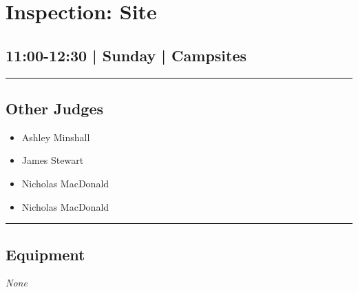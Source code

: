 \documentclass[10pt, A5]{article}
\begin{document}
        \begin{framed}
        \begin{minipage}{\textwidth}

        \setcounter{section}{74}
        \section{Inspection: Site}
        \subsection*{11:00-12:30 | Sunday | Campsites}

        \vspace{0.25cm}
        \hrule
        \vspace{0.25cm}


        \subsection*{Other Judges}
                    

        	\begin{multicols}{2}

		\begin{itemize}
									\item Ashley Minshall
									\item James Stewart
									\item Nicholas MacDonald
						\end{itemize}

		\vfill\null
		\columnbreak

		\begin{itemize}
									\item Nicholas MacDonald
						\end{itemize}

		\vfill\null

		\end{multicols}

    \vspace{0.25cm}
        \hrule
        \vspace{0.25cm}

        \begin{multicols}{2}

		\section*{\faWrench \: Equipment}

				\textit{None}
		

\end{multicols}
\end{minipage}
\end{framed}
\end{document}
